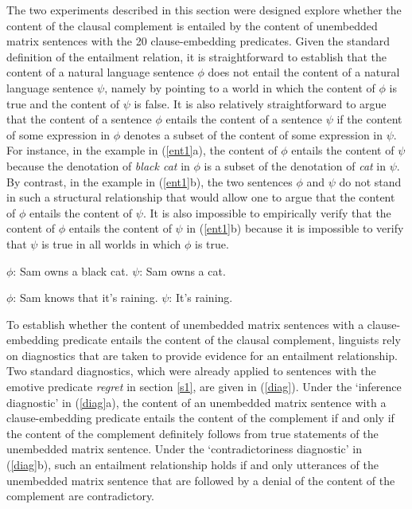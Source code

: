 \documentclass[11pt,fleqn]{article}
\newcommand{\6}{\mbox{$[\hspace*{-.6mm}[$}}
\newcommand{\9}{\mbox{$]\hspace*{-.6mm}]$}}
\begin{document}
The two experiments described in this section were designed explore whether the content of the clausal complement is entailed by the content of unembedded matrix sentences with the 20 clause-embedding predicates. Given the standard definition of the entailment relation, it is straightforward to establish that the content of a natural language sentence $\phi$ does not entail the content of a natural language sentence $\psi$, namely by pointing to a world in which the content of $\phi$ is true and the content of $\psi$ is false. It is also relatively straightforward to argue that the content of a sentence $\phi$ entails the content of a sentence $\psi$ if the content of some expression in $\phi$ denotes a subset of the content of some expression in $\psi$. For instance, in the example in (\ref{ent1}a),  the content of $\phi$ entails the content of $\psi$ because the denotation of {\em black cat} in $\phi$ is a subset of the denotation of {\em cat} in $\psi$. By contrast, in the example in (\ref{ent1}b), the two sentences $\phi$ and $\psi$ do not stand in such a structural relationship that would allow one to argue that the content of $\phi$ entails the content of $\psi$. It is also impossible to empirically verify that the content of $\phi$ entails the content of $\psi$ in (\ref{ent1}b) because it is impossible to  verify that $\psi$ is true in all worlds in which $\phi$ is true. 

\begin{exe}
\ex\label{ent1}
\begin{xlist}
\ex $\phi$: Sam owns a black cat. \hspace*{1.5cm} $\psi$: Sam owns a cat.

\ex $\phi$: Sam knows that it's raining. \hspace*{.6cm} $\psi$: It's raining.

\end{xlist}
\end{exe}
To establish whether the content of unembedded matrix sentences with a clause-embedding predicate entails the content of the clausal complement, linguists rely on diagnostics that are taken to provide evidence for an entailment relationship. Two standard diagnostics, which were already applied to sentences with the emotive predicate {\em regret} in section \ref{s1}, are given in (\ref{diag}). Under the `inference diagnostic' in (\ref{diag}a), the content of an unembedded matrix sentence with a clause-embedding predicate entails the content of the complement if and only if the content of the complement definitely follows from true statements of the unembedded matrix sentence. Under the `contradictoriness diagnostic' in (\ref{diag}b), such an entailment relationship holds if and only utterances of the unembedded matrix sentence that are followed by a denial of the content of the complement are contradictory. 
\end{document}
